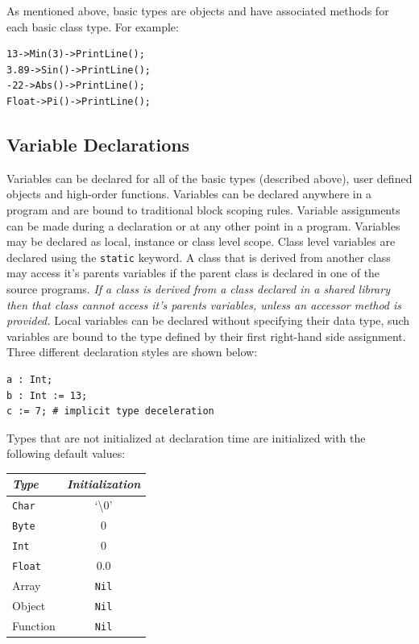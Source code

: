 \documentclass[11pt]{article}
\begin{document}
As mentioned above, basic types are objects and have associated
methods for each basic class type.  For example:

\begin{verbatim}
13->Min(3)->PrintLine();
3.89->Sin()->PrintLine();
-22->Abs()->PrintLine();
Float->Pi()->PrintLine();
\end{verbatim}

\subsection{Variable Declarations}
Variables can be declared for all of the basic types (described
above), user defined objects and high-order functions. Variables can
be declared anywhere in a program and are bound to traditional block
scoping rules.  Variable assignments can be made during a declaration
or at any other point in a program. Variables may be declared as
local, instance or class level scope.  Class level variables are
declared using the \texttt{static} keyword. A class that is derived
from another class may access it's parents variables if the parent
class is declared in one of the source programs.  \textit{If a class
  is derived from a class declared in a shared library then that class
  cannot access it's parents variables, unless an accessor method is
  provided.}  Local variables can be declared without specifying their
data type, such variables are bound to the type defined by their first
right-hand side assignment. Three different declaration styles are
shown below:

\begin{verbatim}
a : Int;
b : Int := 13;
c := 7; # implicit type deceleration 
\end{verbatim}

Types that are not initialized at declaration time are initialized
with the following default values:

\vspace{\baselineskip}
\begin{center}
  \begin{tabular}{| l | c |}
    \hline
    \emph{Type} & \emph{Initialization} \\ \hline \hline
    \texttt{Char} & `\textbackslash0' \\ \hline
    \texttt{Byte} & 0 \\ \hline
    \texttt{Int} & 0 \\ \hline
    \texttt{Float} & 0.0 \\ \hline
    Array & \texttt{Nil} \\ \hline
    Object & \texttt{Nil} \\ \hline
    Function & \texttt{Nil} \\ \hline
  \end{tabular}
\end{center}
\end{document}
